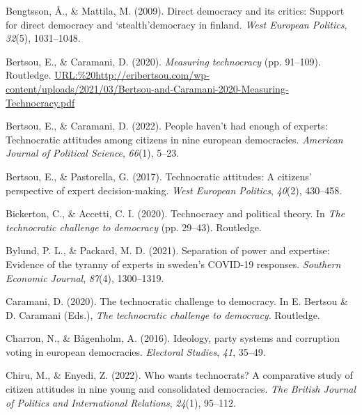 \documentclass[
  12pt,
  english,
]{article}
\newlength{\cslhangindent}
\newlength{\cslentryspacingunit} %
\newenvironment{CSLReferences}[2] %
 {%
  \setlength{\parindent}{0pt}
  \ifodd #1
  \let\oldpar\par
  \def\par{\hangindent=\cslhangindent\oldpar}
  \fi
  \setlength{\parskip}{#2\cslentryspacingunit}
 }%
 {}
\begin{document}
\hypertarget{refs}{}
\begin{CSLReferences}{1}{0}
\leavevmode{}%
Bengtsson, Å., \& Mattila, M. (2009). Direct democracy and its critics:
Support for direct democracy and `stealth'democracy in finland.
\emph{West European Politics}, \emph{32}(5), 1031--1048.

\leavevmode{}%
Bertsou, E., \& Caramani, D. (2020). \emph{Measuring technocracy} (pp.
91--109). Routledge.
\url{URL:\%20http://eribertsou.com/wp-content/uploads/2021/03/Bertsou-and-Caramani-2020-Measuring-Technocracy.pdf}

\leavevmode{}%
Bertsou, E., \& Caramani, D. (2022). People haven't had enough of
experts: Technocratic attitudes among citizens in nine european
democracies. \emph{American Journal of Political Science}, \emph{66}(1),
5--23.

\leavevmode{}%
Bertsou, E., \& Pastorella, G. (2017). Technocratic attitudes: A
citizens' perspective of expert decision-making. \emph{West European
Politics}, \emph{40}(2), 430--458.

\leavevmode{}%
Bickerton, C., \& Accetti, C. I. (2020). Technocracy and political
theory. In \emph{The technocratic challenge to democracy} (pp. 29--43).
Routledge.

\leavevmode{}%
Bylund, P. L., \& Packard, M. D. (2021). Separation of power and
expertise: Evidence of the tyranny of experts in sweden's COVID-19
responses. \emph{Southern Economic Journal}, \emph{87}(4), 1300--1319.

\leavevmode{}%
Caramani, D. (2020). The technocratic challenge to democracy. In E.
Bertsou \& D. Caramani (Eds.), \emph{The technocratic challenge to
democracy}. Routledge.

\leavevmode{}%
Charron, N., \& Bågenholm, A. (2016). Ideology, party systems and
corruption voting in european democracies. \emph{Electoral Studies},
\emph{41}, 35--49.

\leavevmode{}%
Chiru, M., \& Enyedi, Z. (2022). Who wants technocrats? A comparative
study of citizen attitudes in nine young and consolidated democracies.
\emph{The British Journal of Politics and International Relations},
\emph{24}(1), 95--112.


\end{CSLReferences}
\end{document}
